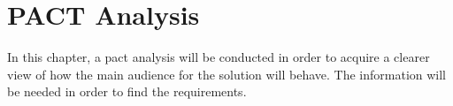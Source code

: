 





\chapter{PACT Analysis}
In this chapter, a pact analysis will be conducted in order to acquire a clearer view of how the main audience for the solution will behave. The information will be needed in order to find the requirements.

